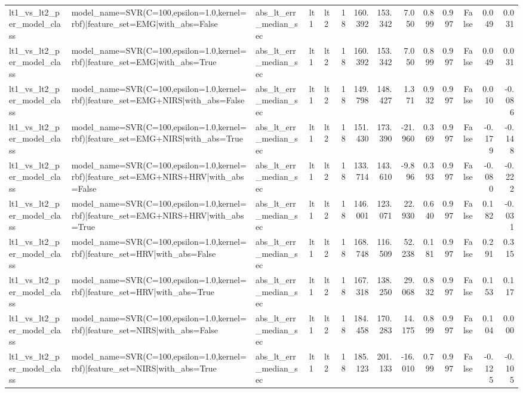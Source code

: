 \begin{table}
\begin{tabular}{lllllrrrrrrrrr}
lt1_vs_lt2_per_model_class & model_name=SVR(C=100,epsilon=1.0,kernel=rbf)|feature_set=EMG|with_abs=False & abs_lt_err_median_sec & lt1 & lt2 & 18 & 160.392 & 153.342 & 7.050 & 0.899 & 0.997 & False & 0.049 & 0.031 \\
lt1_vs_lt2_per_model_class & model_name=SVR(C=100,epsilon=1.0,kernel=rbf)|feature_set=EMG|with_abs=True & abs_lt_err_median_sec & lt1 & lt2 & 18 & 160.392 & 153.342 & 7.050 & 0.899 & 0.997 & False & 0.049 & 0.031 \\
lt1_vs_lt2_per_model_class & model_name=SVR(C=100,epsilon=1.0,kernel=rbf)|feature_set=EMG+NIRS|with_abs=False & abs_lt_err_median_sec & lt1 & lt2 & 18 & 149.798 & 148.427 & 1.371 & 0.932 & 0.997 & False & 0.010 & -0.086 \\
lt1_vs_lt2_per_model_class & model_name=SVR(C=100,epsilon=1.0,kernel=rbf)|feature_set=EMG+NIRS|with_abs=True & abs_lt_err_median_sec & lt1 & lt2 & 18 & 151.430 & 173.390 & -21.960 & 0.369 & 0.997 & False & -0.179 & -0.148 \\
lt1_vs_lt2_per_model_class & model_name=SVR(C=100,epsilon=1.0,kernel=rbf)|feature_set=EMG+NIRS+HRV|with_abs=False & abs_lt_err_median_sec & lt1 & lt2 & 18 & 133.714 & 143.610 & -9.896 & 0.393 & 0.997 & False & -0.080 & -0.222 \\
lt1_vs_lt2_per_model_class & model_name=SVR(C=100,epsilon=1.0,kernel=rbf)|feature_set=EMG+NIRS+HRV|with_abs=True & abs_lt_err_median_sec & lt1 & lt2 & 18 & 146.001 & 123.071 & 22.930 & 0.640 & 0.997 & False & 0.182 & -0.031 \\
lt1_vs_lt2_per_model_class & model_name=SVR(C=100,epsilon=1.0,kernel=rbf)|feature_set=HRV|with_abs=False & abs_lt_err_median_sec & lt1 & lt2 & 18 & 168.748 & 116.509 & 52.238 & 0.181 & 0.997 & False & 0.291 & 0.315 \\
lt1_vs_lt2_per_model_class & model_name=SVR(C=100,epsilon=1.0,kernel=rbf)|feature_set=HRV|with_abs=True & abs_lt_err_median_sec & lt1 & lt2 & 18 & 167.318 & 138.250 & 29.068 & 0.832 & 0.997 & False & 0.153 & 0.117 \\
lt1_vs_lt2_per_model_class & model_name=SVR(C=100,epsilon=1.0,kernel=rbf)|feature_set=NIRS|with_abs=False & abs_lt_err_median_sec & lt1 & lt2 & 18 & 184.458 & 170.283 & 14.175 & 0.899 & 0.997 & False & 0.104 & 0.000 \\
lt1_vs_lt2_per_model_class & model_name=SVR(C=100,epsilon=1.0,kernel=rbf)|feature_set=NIRS|with_abs=True & abs_lt_err_median_sec & lt1 & lt2 & 18 & 185.123 & 201.133 & -16.010 & 0.799 & 0.997 & False & -0.125 & -0.105 \\

\end{tabular}
\end{table}
